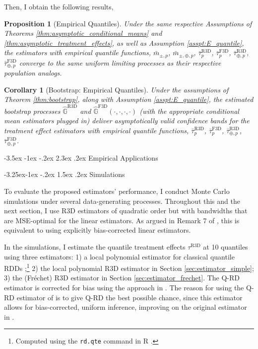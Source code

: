 \documentclass[12pt]{article}
\makeatletter
\renewcommand\section{\@startsection{section}{1}{\z@}%
  {-3.5ex \@plus -1ex \@minus -.2ex}%
  {2.3ex \@plus.2ex}%
  {\bfseries\large\center}} %
\renewcommand\subsection{\@startsection{subsection}{2}{\z@}%
  {-3.25ex\@plus -1ex \@minus -.2ex}%
  {1.5ex \@plus .2ex}%
  {\itshape\large\center}} %
\newtheorem{proposition}{Proposition}
\newtheorem{corollary}{Corollary}
\makeatother
\begin{document}
Then, I obtain the following results, 

\begin{proposition}[Empirical Quantiles] \label{prop:empirical_quantiles}
Under the same respective Assumptions of Theorems \ref{thm:asymptotic_conditional_means} and \ref{thm:asymptotic_treatment_effects}, as well as Assumption \ref{asspt:E_quantile}, the estimators with empirical quantile functions, $\bar{m}_{\pm,p}$, $\bar{m}_{\pm, \oplus,p}$, $\bar{\tau}^{\mathrm{R3D}}_p$, $\bar{\tau}^{\mathrm{F3D}}_p$, $\bar{\tau}^{\mathrm{R3D}}_{\oplus, p}$, $\bar{\tau}_{\oplus,p}^{\mathrm{F3D}}$ converge to the same uniform limiting processes as their respective population analogs.
\end{proposition}

\begin{corollary}[Bootstrap: Empirical Quantiles] Under the assumptions of Theorem \ref{thm:bootstrap}, along with Assumption \ref{asspt:E_quantile}, the estimated bootstrap processes $\hat{\mathbb{G}}^{\mathrm{R3D}}$ and $\hat{\mathbb{G}}^{\mathrm{F3D}}(\cdot, \cdot, \cdot, \cdot)$ (with the appropriate conditional mean estimators plugged in) deliver asymptotically valid confidence bands for the treatment effect estimators with empirical quantile functions, $\bar{\tau}_{p}^{\mathrm{R3D}}$, $\bar{\tau}_{p}^{\mathrm{F3D}}$, $\bar{\tau}_{\oplus,p}^{\mathrm{R3D}}$, $\bar{\tau}_{\oplus,p}^{\mathrm{F3D}}$.
\end{corollary}


\section{Empirical Applications}


\subsection{Simulations} \label{sec:simulations}

To evaluate the proposed estimators’ performance, I conduct Monte Carlo simulations under several data-generating processes. Throughout this and the next section, I use R3D estimators of quadratic order but with bandwidths that are MSE-optimal for the linear estimators. As argued in Remark 7 of \citet{calonico2014robust}, this is equivalent to using explicitly bias-corrected linear estimators. 

In the simulations, I estimate the quantile treatment effects $\tau^{\mathrm{R3D}}$ at 10 quantiles using three estimators: 1) a local polynomial estimator for classical quantile RDDs \citep{qu2019uniform};\footnote{Computed using the \texttt{rd.qte} command in R \citep{qu2024qte}.}  2) the local polynomial R3D estimator in Section \ref{sec:estimator_simple}; 3) the (Fr\'echet) R3D estimator in Section \ref{sec:estimator_frechet}. The Q-RD estimator is corrected for bias using the approach in \citep{qu2024inference}. The reason for using the Q-RD estimator of \citet{qu2019uniform} is to give Q-RD the best possible chance, since this estimator allows for bias-corrected, uniform inference, improving on the original estimator in \citet{frandsen2012quantile}.
\end{document}
